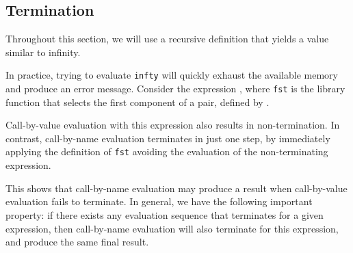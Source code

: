 \subsection{Termination}\label{subsec:Termination}
Throughout this section, we will use a recursive definition that yields a value similar to infinity.

In practice, trying to evaluate \texttt{infty} will quickly exhaust the available memory and produce an error message.
Consider the expression , where \texttt{fst} is the library function that selects the first component of a pair, defined by .

Call-by-value evaluation with this expression also results in non-termination.
In contrast, call-by-name evaluation terminates in just one step, by immediately applying the definition of \texttt{fst} avoiding the evaluation of the non-terminating expression.

This shows that call-by-name evaluation may produce a result when call-by-value evaluation fails to terminate.
In general, we have the following important property: if there exists any evaluation sequence that terminates for a given expression, then call-by-name evaluation will also terminate for this expression, and produce the same final result.

